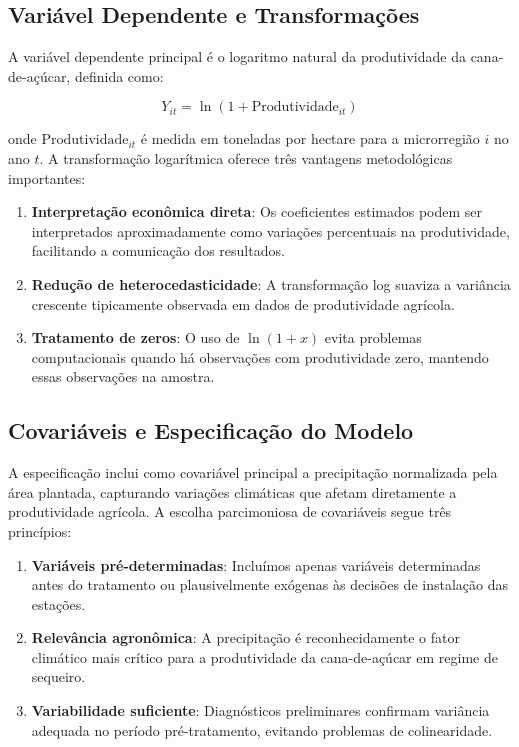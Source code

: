 \documentclass[
	12pt,				%
	openright,			%
	oneside,			%
	a4paper,			%
	english,			%
	french,				%
	spanish,			%
	brazil				%
	]{abntex2}
\begin{document}
\subsection{Variável Dependente e Transformações}

A variável dependente principal é o logaritmo natural da produtividade da cana-de-açúcar, definida como:

\begin{equation}
Y_{it} = \ln(1 + \text{Produtividade}_{it})
\end{equation}

onde $\text{Produtividade}_{it}$ é medida em toneladas por hectare para a microrregião $i$ no ano $t$. A transformação logarítmica oferece três vantagens metodológicas importantes:

\begin{enumerate}
\item \textbf{Interpretação econômica direta}: Os coeficientes estimados podem ser interpretados aproximadamente como variações percentuais na produtividade, facilitando a comunicação dos resultados.

\item \textbf{Redução de heterocedasticidade}: A transformação log suaviza a variância crescente tipicamente observada em dados de produtividade agrícola.

\item \textbf{Tratamento de zeros}: O uso de $\ln(1+x)$ evita problemas computacionais quando há observações com produtividade zero, mantendo essas observações na amostra.
\end{enumerate}

\subsection{Covariáveis e Especificação do Modelo}

A especificação inclui como covariável principal a precipitação normalizada pela área plantada, capturando variações climáticas que afetam diretamente a produtividade agrícola. A escolha parcimoniosa de covariáveis segue três princípios:

\begin{enumerate}
\item \textbf{Variáveis pré-determinadas}: Incluímos apenas variáveis determinadas antes do tratamento ou plausivelmente exógenas às decisões de instalação das estações.

\item \textbf{Relevância agronômica}: A precipitação é reconhecidamente o fator climático mais crítico para a produtividade da cana-de-açúcar em regime de sequeiro.

\item \textbf{Variabilidade suficiente}: Diagnósticos preliminares confirmam variância adequada no período pré-tratamento, evitando problemas de colinearidade.
\end{enumerate}
\end{document}
